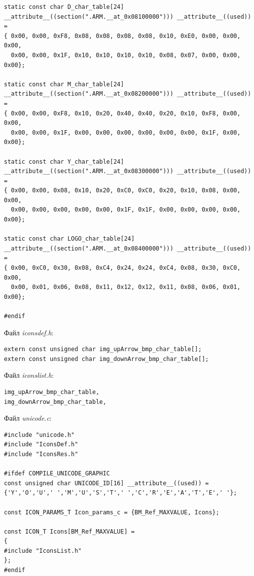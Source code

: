 \documentclass[oneside,14pt]{extarticle}
\begin{document}
\begin{normalsize}
{\begin{lstlisting}
static const char D_char_table[24] __attribute__((section(".ARM.__at_0x08100000"))) __attribute__((used)) =
{ 0x00, 0x00, 0xF8, 0x08, 0x08, 0x08, 0x08, 0x10, 0xE0, 0x00, 0x00, 0x00,
  0x00, 0x00, 0x1F, 0x10, 0x10, 0x10, 0x10, 0x08, 0x07, 0x00, 0x00, 0x00};
	
static const char M_char_table[24] __attribute__((section(".ARM.__at_0x08200000"))) __attribute__((used)) =
{ 0x00, 0x00, 0xF8, 0x10, 0x20, 0x40, 0x40, 0x20, 0x10, 0xF8, 0x00, 0x00,
  0x00, 0x00, 0x1F, 0x00, 0x00, 0x00, 0x00, 0x00, 0x00, 0x1F, 0x00, 0x00};
	
static const char Y_char_table[24] __attribute__((section(".ARM.__at_0x08300000"))) __attribute__((used)) =
{ 0x00, 0x00, 0x08, 0x10, 0x20, 0xC0, 0xC0, 0x20, 0x10, 0x08, 0x00, 0x00,
  0x00, 0x00, 0x00, 0x00, 0x00, 0x1F, 0x1F, 0x00, 0x00, 0x00, 0x00, 0x00};

static const char LOGO_char_table[24] __attribute__((section(".ARM.__at_0x08400000"))) __attribute__((used))  =
{ 0x00, 0xC0, 0x30, 0x08, 0xC4, 0x24, 0x24, 0xC4, 0x08, 0x30, 0xC0, 0x00,
  0x00, 0x01, 0x06, 0x08, 0x11, 0x12, 0x12, 0x11, 0x08, 0x06, 0x01, 0x00};

#endif
		\end{lstlisting}
	}
	Файл \textit{iconsdef.h}:
	{\small
		\begin{lstlisting}
extern const unsigned char img_upArrow_bmp_char_table[];
extern const unsigned char img_downArrow_bmp_char_table[];
		\end{lstlisting}
	}
	Файл \textit{iconslist.h}:
	{\small
		\begin{lstlisting}
img_upArrow_bmp_char_table,
img_downArrow_bmp_char_table,
		\end{lstlisting}
	}
	Файл \textit{unicode.c}:
	{\small
		\begin{lstlisting}
#include "unicode.h"
#include "IconsDef.h"
#include "IconsRes.h"

#ifdef COMPILE_UNICODE_GRAPHIC
const unsigned char UNICODE_ID[16] __attribute__((used)) = {'Y','O','U',' ','M','U','S','T',' ','C','R','E','A','T','E',' '}; 

const ICON_PARAMS_T Icon_params_c = {BM_Ref_MAXVALUE, Icons};

const ICON_T Icons[BM_Ref_MAXVALUE] =
{
#include "IconsList.h"
};
#endif
		\end{lstlisting}
	}
	

\end{normalsize}
\end{document}
